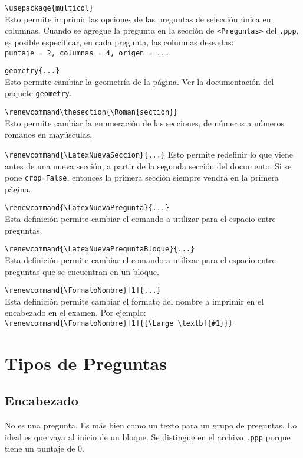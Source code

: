 \documentclass[12pt]{article}
\theoremstyle{definition}
\begin{document}
\noindent \verb|\usepackage{multicol}| \\
Esto permite imprimir las opciones de las preguntas de selecci\'on \'unica en columnas. Cuando se agregue la pregunta en la secci\'on de \verb|<Preguntas>| del \verb|.ppp|, es posible especificar, en cada pregunta, las columnas deseadas: \\
\verb|puntaje = 2, columnas = 4, origen = ...|
\medskip

\noindent \verb|geometry{...}| \\
  Esto permite cambiar la geometr\'ia de la p\'agina. Ver la documentaci\'on del paquete \verb|geometry|.
\medskip

\noindent \verb|\renewcommand\thesection{\Roman{section}}| \\
  Esto permite cambiar la enumeraci\'on de las secciones, de n\'umeros a n\'umeros romanos en may\'usculas.

\noindent \verb|\renewcommand{\LatexNuevaSeccion}{...}|
  Esto permite redefinir lo que viene antes de una nueva secci\'on, a partir de la segunda secci\'on del documento. Si se pone \verb|crop=False|, entonces la primera secci\'on siempre vendr\'a en la primera p\'agina.

\noindent \verb|\renewcommand{\LatexNuevaPregunta}{...}| \\
Esta definici\'on permite cambiar el comando a utilizar para el espacio entre preguntas.
\medskip

\noindent \verb|\renewcommand{\LatexNuevaPreguntaBloque}{...}| \\
Esta definici\'on permite cambiar el comando a utilizar para el espacio entre preguntas que se encuentran en un bloque.
\medskip

\noindent \verb|\renewcommand{\FormatoNombre}[1]{...}| \\
Esta definici\'on permite cambiar el formato del nombre a imprimir en el encabezado en el examen. Por ejemplo: \\
\verb|\renewcommand{\FormatoNombre}[1]{{\Large \textbf{#1}}}|
\medskip


\section{Tipos de Preguntas}

\subsection{Encabezado}
No es una pregunta. Es más bien como un texto para un grupo de preguntas. Lo ideal es que vaya al inicio de un bloque. Se distingue en el archivo \verb|.ppp| porque tiene un puntaje de 0.
\end{document}
